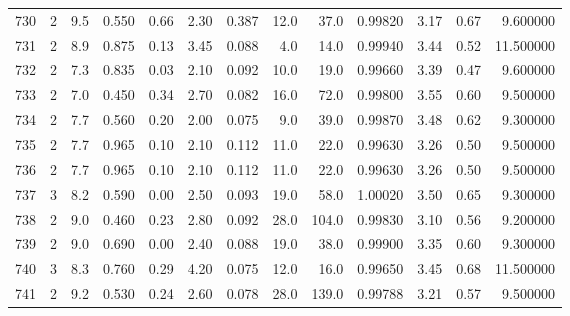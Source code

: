 \begin{tabular}{lrrrrrrrrrrrr}
730  &        2 &            9.5 &             0.550 &         0.66 &            2.30 &      0.387 &                 12.0 &                  37.0 &  0.99820 &  3.17 &       0.67 &   9.600000 \\
731  &        2 &            8.9 &             0.875 &         0.13 &            3.45 &      0.088 &                  4.0 &                  14.0 &  0.99940 &  3.44 &       0.52 &  11.500000 \\
732  &        2 &            7.3 &             0.835 &         0.03 &            2.10 &      0.092 &                 10.0 &                  19.0 &  0.99660 &  3.39 &       0.47 &   9.600000 \\
733  &        2 &            7.0 &             0.450 &         0.34 &            2.70 &      0.082 &                 16.0 &                  72.0 &  0.99800 &  3.55 &       0.60 &   9.500000 \\
734  &        2 &            7.7 &             0.560 &         0.20 &            2.00 &      0.075 &                  9.0 &                  39.0 &  0.99870 &  3.48 &       0.62 &   9.300000 \\
735  &        2 &            7.7 &             0.965 &         0.10 &            2.10 &      0.112 &                 11.0 &                  22.0 &  0.99630 &  3.26 &       0.50 &   9.500000 \\
736  &        2 &            7.7 &             0.965 &         0.10 &            2.10 &      0.112 &                 11.0 &                  22.0 &  0.99630 &  3.26 &       0.50 &   9.500000 \\
737  &        3 &            8.2 &             0.590 &         0.00 &            2.50 &      0.093 &                 19.0 &                  58.0 &  1.00020 &  3.50 &       0.65 &   9.300000 \\
738  &        2 &            9.0 &             0.460 &         0.23 &            2.80 &      0.092 &                 28.0 &                 104.0 &  0.99830 &  3.10 &       0.56 &   9.200000 \\
739  &        2 &            9.0 &             0.690 &         0.00 &            2.40 &      0.088 &                 19.0 &                  38.0 &  0.99900 &  3.35 &       0.60 &   9.300000 \\
740  &        3 &            8.3 &             0.760 &         0.29 &            4.20 &      0.075 &                 12.0 &                  16.0 &  0.99650 &  3.45 &       0.68 &  11.500000 \\
741  &        2 &            9.2 &             0.530 &         0.24 &            2.60 &      0.078 &                 28.0 &                 139.0 &  0.99788 &  3.21 &       0.57 &   9.500000 \\

\end{tabular}
